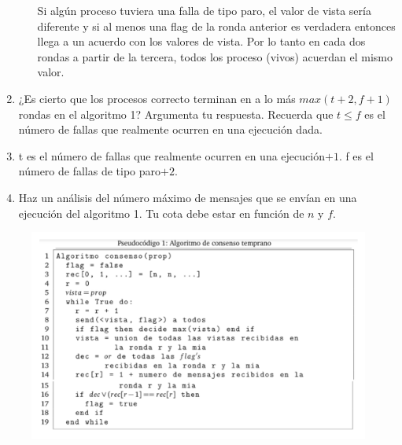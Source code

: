 \begin{enumerate}
\begin{itemize}
        Si algún proceso tuviera una falla de tipo paro, el valor de vista sería diferente y si al menos una flag de la ronda anterior es verdadera entonces llega a un acuerdo con los valores de vista.
        Por lo tanto en cada dos rondas a partir de la tercera, todos los proceso (vivos) acuerdan el mismo valor.
    \end{itemize}
    

    \item ¿Es cierto que los procesos correcto terminan en a lo más $max(t +2, f +1)$ rondas en el algoritmo 1? Argumenta tu respuesta. Recuerda que $t \leq f$ es el número de fallas que realmente ocurren en una ejecución dada.
    \item 
    t es el número de fallas que realmente ocurren en una ejecución$+1$.
    f es el número de fallas de tipo paro$+2$.
    
    \item Haz un análisis del número máximo de mensajes que se envían en una ejecución del algoritmo 1. Tu cota debe estar en función de $n$ y $f$.
\end{enumerate}

\begin{figure}
    \includegraphics[width=\textwidth]{consensoTemprano.png}
\end{figure}